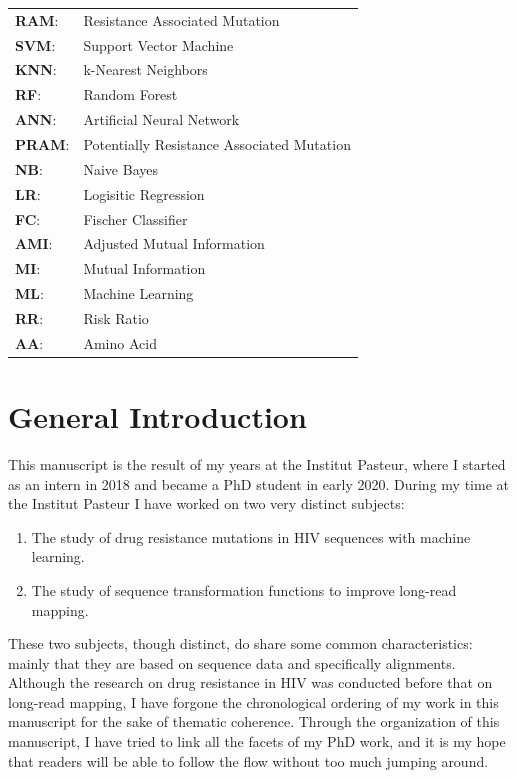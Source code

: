 \documentclass[
  11pt,
  twoside,
  BCOR=10mm,
  listof=totoc]{scrbook}
\providecommand{\tightlist}{%
  \setlength{\itemsep}{0pt}\setlength{\parskip}{0pt}}
\begin{document}
\begin{tabular}{ll}
\textbf{RAM}:& Resistance Associated Mutation \\
\textbf{SVM}:& Support Vector Machine \\
\textbf{KNN}:& k-Nearest Neighbors \\
\textbf{RF}:& Random Forest \\
\textbf{ANN}:& Artificial Neural Network \\
\textbf{PRAM}:& Potentially Resistance Associated Mutation \\
\textbf{NB}:& Naive Bayes \\
\textbf{LR}:& Logisitic Regression \\
\textbf{FC}:& Fischer Classifier \\
\textbf{AMI}:& Adjusted Mutual Information \\
\textbf{MI}:& Mutual Information \\
\textbf{ML}:& Machine Learning \\
\textbf{RR}:& Risk Ratio \\
\textbf{AA}:& Amino Acid \\
\end{tabular}

\mainmatter

\pagestyle{fancy}
\fancyhf{}
\fancyhead[RO]{\rightmark}
\fancyfoot[CO,CE]{\thepage}

\hypertarget{general-introduction}{%
\chapter*{General Introduction}\label{general-introduction}}

This manuscript is the result of my years at the Institut Pasteur, where I started as an intern in 2018 and became a PhD student in early 2020. During my time at the Institut Pasteur I have worked on two very distinct subjects:

\begin{enumerate}
\def\labelenumi{\arabic{enumi}.}
\tightlist
\item
  The study of drug resistance mutations in HIV sequences with machine learning.
\item
  The study of sequence transformation functions to improve long-read mapping.
\end{enumerate}

These two subjects, though distinct, do share some common characteristics: mainly that they are based on sequence data and specifically alignments. Although the research on drug resistance in HIV was conducted before that on long-read mapping, I have forgone the chronological ordering of my work in this manuscript for the sake of thematic coherence. Through the organization of this manuscript, I have tried to link all the facets of my PhD work, and it is my hope that readers will be able to follow the flow without too much jumping around.
\end{document}
